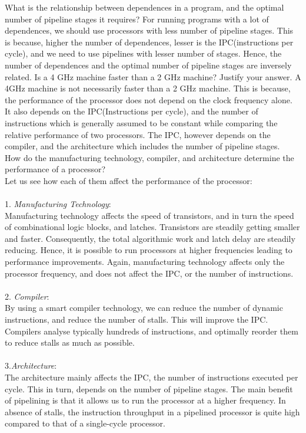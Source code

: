 \begin{ExerciseList}
\Exercise
What is the relationship between dependences in a program, and the optimal number of pipeline stages
it requires?
\Answer
For running programs with a lot of dependences, we should use processors with less number of pipeline stages. This is because, higher the number of dependences, lesser is the IPC(instructions per cycle), and we need to use pipelines with lesser number of stages. Hence, the number of dependences and the optimal number of pipeline stages are inversely related.
\Exercise
Is a 4 GHz machine faster than a 2 GHz machine? Justify your answer.
\Answer
A 4GHz machine is not necessarily faster than a 2 GHz machine. This is because, the performance of the processor does not depend on the clock frequency alone. It also depends on the IPC(Instructions per cycle), and the number of instructions which is generally assumed to be constant while comparing the relative performance of two processors. The IPC, however depends on the compiler, and the architecture which includes the number of pipeline stages. \\
\Exercise
How do the manufacturing technology, compiler, and architecture determine the
performance of a processor?
\Answer
\hspace{1mm} \\
Let us see how each of them affect the performance of the processor: \\ \\
1. \textit{Manufacturing Technology}: \\
Manufacturing technology affects the speed of transistors, and in turn the speed of combinational logic blocks, and latches. Transistors are steadily getting smaller and faster. Consequently, the total algorithmic work and latch delay are steadily reducing. Hence, it is possible to run processors at higher frequencies leading to performance improvements. Again, manufacturing technology affects only the processor frequency, and does not affect the IPC, or the number of instructions. \\ \\
2. \textit{Compiler}: \\
By using a smart compiler technology, we can reduce the number of dynamic instructions, and reduce the number of stalls. This will improve the IPC. Compilers analyse typically hundreds of instructions, and optimally reorder them to reduce stalls as much as possible. \\ \\
3.\textit{Architecture}: \\
The architecture mainly affects the IPC, the number of instructions executed per cycle. This in turn, depends on the number of pipeline stages. The main benefit of pipelining is that it allows us to run the processor at a higher frequency. In absence of stalls, the instruction throughput in a pipelined processor is quite high compared to that of a single-cycle processor. \\ 

\end{ExerciseList}
